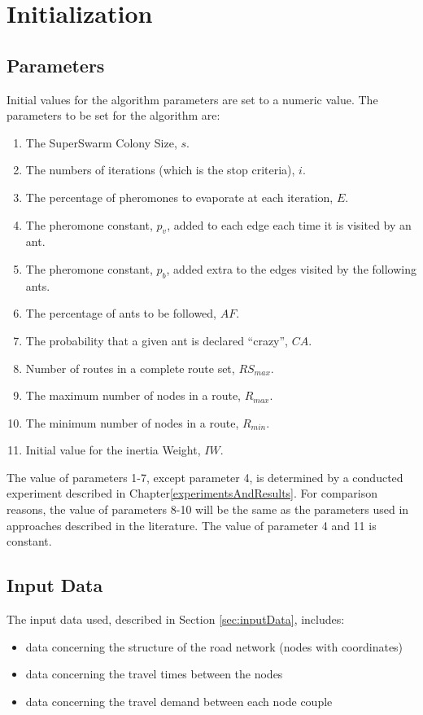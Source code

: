 \section{Initialization}
\label{sec:algoInitialization}
\subsection{Parameters}
Initial values for the algorithm parameters are set to a numeric value. The parameters to be set for the algorithm are:
\begin{enumerate}
\item The SuperSwarm Colony Size, $s$. 
\item The numbers of iterations (which is the stop criteria), $i$.
\item The percentage of pheromones to evaporate at each iteration, $E$.
\item The pheromone constant, $p_v$, added to each edge each time it is visited by an ant.
\item The pheromone constant, $p_b$, added extra to the edges visited by the following ants. 
\item The percentage of ants to be followed, $AF$.
\item The probability that a given ant is declared ``crazy'', $CA$.
\item Number of routes in a complete route set, $RS_{max}$. 
\item The maximum number of nodes in a route, $R_{max}$.
\item The minimum number of nodes in a route, $R_{min}$.
\item Initial value for the inertia Weight, $IW$.
\end{enumerate}
The value of parameters 1-7, except parameter 4, is determined by a conducted experiment described in Chapter\vref{experimentsAndResults}. For comparison reasons, the value of parameters 8-10 will be the same as the parameters used in approaches described in the literature\citep{mandl79, kechagiopoulos14, nikolic14,kidwai98,fan10,chakroborty02,zhang10,chew12,baaj91}. The value of parameter 4 and 11 is constant. 

\subsection{Input Data}
The input data used, described in Section \vref{sec:inputData}, includes:
\begin{itemize}
\item data concerning the structure of the road network (nodes with coordinates)
\item data concerning the travel times between the nodes 
\item data concerning the travel demand between each node couple
\end{itemize}

